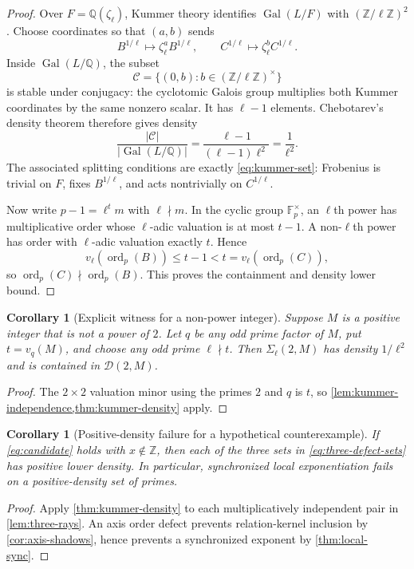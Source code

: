 \documentclass[11pt]{article}
\newtheorem{corollary}[theorem]{Corollary}
\theoremstyle{definition}
\newcommand{\Z}{\mathbb Z}
\newcommand{\Q}{\mathbb Q}
\newcommand{\F}{\mathbb F}
\newcommand{\ord}{\operatorname{ord}}
\newcommand{\Gal}{\operatorname{Gal}}
\newcommand{\Def}{\mathcal D}
\begin{document}
\begin{proof}
Over $F=\Q(\zeta_\ell)$, Kummer theory identifies
$\Gal(L/F)$ with $(\Z/\ell\Z)^2$.  Choose coordinates so that
$(a,b)$ sends
\[
 B^{1/\ell}\longmapsto\zeta_\ell^aB^{1/\ell},
 \qquad
 C^{1/\ell}\longmapsto\zeta_\ell^bC^{1/\ell}.
\]
Inside $\Gal(L/\Q)$, the subset
\[
 \mathcal C=\{(0,b):b\in(\Z/\ell\Z)^\times\}
\]
is stable under conjugacy: the cyclotomic Galois group multiplies both Kummer coordinates by
the same nonzero scalar.  It has $\ell-1$ elements.  Chebotarev's density theorem therefore
gives density
\[
 \frac{|\mathcal C|}{|\Gal(L/\Q)|}
 =\frac{\ell-1}{(\ell-1)\ell^2}
 =\frac1{\ell^2}.
\]
The associated splitting conditions are exactly \eqref{eq:kummer-set}: Frobenius is trivial on
$F$, fixes $B^{1/\ell}$, and acts nontrivially on $C^{1/\ell}$.

Now write $p-1=\ell^t m$ with $\ell\nmid m$.  In the cyclic group $\F_p^\times$, an
$\ell$th power has multiplicative order whose $\ell$-adic valuation is at most $t-1$.
A non-$\ell$th power has order with $\ell$-adic valuation exactly $t$.  Hence
\[
 v_\ell(\ord_p(B))\le t-1<t=v_\ell(\ord_p(C)),
\]
so $\ord_p(C)\nmid\ord_p(B)$.  This proves the containment and density lower bound.
\end{proof}

\begin{corollary}[Explicit witness for a non-power integer]
\label{cor:explicit-witness}
Suppose $M$ is a positive integer that is not a power of $2$.  Let $q$ be any odd prime
factor of $M$, put $t=v_q(M)$, and choose any odd prime $\ell\nmid t$.  Then
$\Sigma_\ell(2,M)$ has density $1/\ell^2$ and is contained in $\Def(2,M)$.
\end{corollary}

\begin{proof}
The $2\times2$ valuation minor using the primes $2$ and $q$ is $t$, so
\cref{lem:kummer-independence,thm:kummer-density} apply.
\end{proof}

\begin{corollary}[Positive-density failure for a hypothetical counterexample]
\label{cor:candidate-density}
If \eqref{eq:candidate} holds with $x\notin\Z$, then each of the three sets in
\eqref{eq:three-defect-sets} has positive lower density.  In particular, synchronized local
exponentiation fails on a positive-density set of primes.
\end{corollary}

\begin{proof}
Apply \cref{thm:kummer-density} to each multiplicatively independent pair in
\cref{lem:three-rays}.  An axis order defect prevents relation-kernel inclusion by
\cref{cor:axis-shadows}, hence prevents a synchronized exponent by \cref{thm:local-sync}.
\end{proof}
\end{document}
